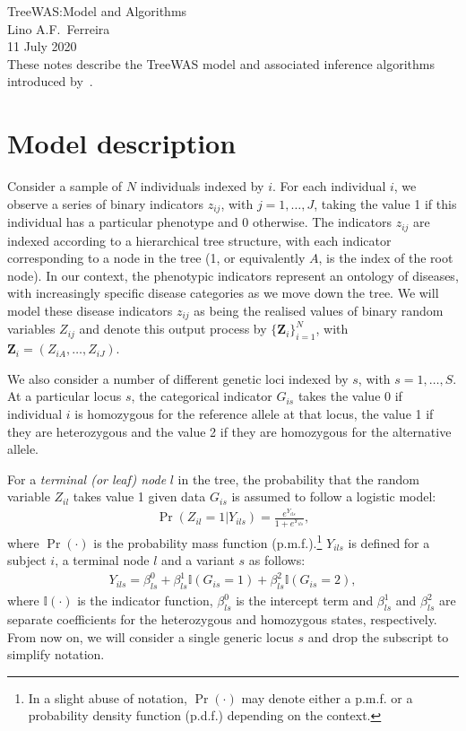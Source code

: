 \documentclass[10pt]{article}
\newcommand{\I}{\mathbb{I}}
\begin{document}

{\noindent\fontsize{15pt}{18pt}\selectfont \textsf{TreeWAS:\@ Model and Algorithms}}\\[20pt]
 Lino A.\hspace{0.08333em}F.\ Ferreira\\11 July 2020\\[20pt]


\noindent These notes describe the TreeWAS model and associated inference algorithms introduced by~\cite{Cortes2017}.

\section{Model description}\label{subsec:modeldesc}

Consider a sample of $N$ individuals indexed by $i$. For each individual $i$, we observe a series of binary indicators $z_{ij}$, with $j=1,\ldots,J$, taking the value 1 if this individual has a particular phenotype and 0 otherwise.
The indicators $z_{ij}$ are indexed according to a hierarchical tree structure, %
with each indicator corresponding to a node in the tree (1, or equivalently $A$, is the index of the root node). In our context, the phenotypic indicators represent an ontology of diseases, with increasingly specific disease categories as we move down the tree.
We will model these disease indicators $z_{ij}$ as being the realised values of binary random variables $Z_{ij}$ and denote this output process by $\{\symbf{Z}_i\}_{i=1}^N$, with $\symbf{Z}_{i} = (Z_{iA},\ldots,Z_{iJ})$.

We also consider a number of different genetic loci indexed by $s$, with $s=1,\ldots,S$. At a particular locus $s$, the categorical indicator $G_{is}$ takes the value 0 if individual $i$ is homozygous for the reference allele at that locus, the value 1 if they are heterozygous and the value 2 if they are homozygous for the alternative allele.

For a \textit{terminal (or leaf) node} $l$ in the tree, the probability that the random variable $Z_{il}$ takes value 1 given data $G_{is}$ is assumed to follow a logistic model:
\begin{align}
  \Pr(Z_{il}=1|Y_{ils}) = \frac{e^{Y_{ils}}}{1 + e^{Y_{ils}}}, \label{eq:emission}
\end{align}
where $\Pr(\cdot)$ is the probability mass function (p.m.f.).\footnote{In a slight abuse of notation, $\Pr(\cdot)$ may denote either a p.m.f. or a probability density function (p.d.f.) depending on the context.} 
$Y_{ils}$ is defined for a subject $i$, a terminal node $l$ and a variant $s$ as follows:
\begin{align*}
  Y_{ils} = \beta_{ls}^0 + \beta_{ls}^1 \I(G_{is}=1) + \beta_{ls}^2\I(G_{is}=2),
\end{align*}
where $\I(\cdot)$ is the indicator function, $\beta_{ls}^0$ is the intercept term and $\beta_{ls}^1$ and $\beta_{ls}^2$ are separate coefficients for the heterozygous and homozygous states, respectively. From now on, we will consider a single generic locus $s$ and drop the subscript to simplify notation.
\end{document}

